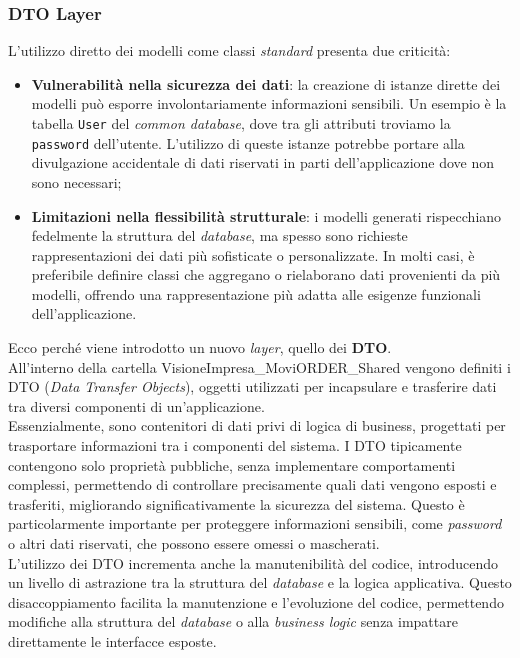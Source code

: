 \subsubsection{DTO Layer}
L'utilizzo diretto dei modelli come classi \textit{standard} presenta due criticità:
\begin{itemize}
    \item \textbf{Vulnerabilità nella sicurezza dei dati}: la creazione di istanze dirette dei modelli può esporre 
          involontariamente informazioni sensibili. Un esempio è la tabella \texttt{User} del \textit{common database}, 
          dove tra gli attributi troviamo la \texttt{password} dell'utente. L'utilizzo di queste 
          istanze potrebbe portare alla divulgazione accidentale di dati riservati in parti dell'applicazione dove 
          non sono necessari;
    \item \textbf{Limitazioni nella flessibilità strutturale}: i modelli generati rispecchiano fedelmente la struttura 
        del \textit{database}, ma spesso sono richieste rappresentazioni dei dati più sofisticate o personalizzate. 
          In molti casi, è preferibile definire classi che aggregano o rielaborano dati provenienti da più modelli, 
          offrendo una rappresentazione più adatta alle esigenze funzionali dell'applicazione.
\end{itemize}
Ecco perché viene introdotto un nuovo \textit{layer}, quello dei \textbf{DTO}.\\
All'interno della cartella VisioneImpresa\_MoviORDER\_Shared vengono definiti i DTO (\textit{Data Transfer Objects}), 
oggetti utilizzati per incapsulare e trasferire dati tra diversi componenti di un'applicazione.\\
Essenzialmente, sono contenitori di dati privi di logica di business, progettati per trasportare informazioni tra i 
componenti del sistema. I DTO tipicamente contengono solo proprietà pubbliche, senza implementare comportamenti complessi, 
permettendo di controllare precisamente quali dati vengono esposti e trasferiti, migliorando significativamente la 
sicurezza del sistema. 
Questo è particolarmente importante per proteggere informazioni sensibili, come \textit{password} o altri dati riservati, 
che possono essere omessi o mascherati.\\
L'utilizzo dei DTO incrementa anche la manutenibilità del codice, introducendo un livello di astrazione tra la 
struttura del \textit{database} e la logica applicativa. Questo disaccoppiamento facilita la manutenzione e 
l'evoluzione del codice, permettendo modifiche alla struttura del \textit{database} o alla \textit{business logic} 
senza impattare direttamente le interfacce esposte.
